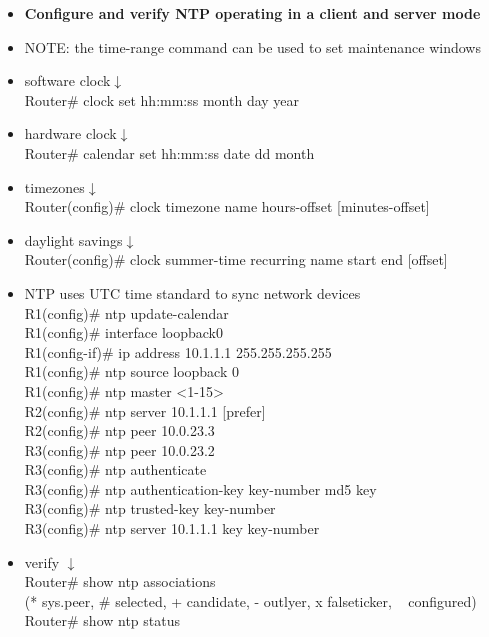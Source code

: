 \documentclass{article}
\begin{document}
\begin{itemize}
  \item \textbf{Configure and verify NTP operating in a client and server mode}
  	\item[] NOTE: the time-range command can be used to set maintenance windows\\
  	\item[] software clock$\downarrow$\\
		Router\# clock set hh:mm:ss month day year
	\item[] hardware clock$\downarrow$\\
		Router\# calendar set hh:mm:ss date dd month
	\item[] timezones$\downarrow$\\
		Router(config)\# clock timezone name hours-offset [minutes-offset]
	\item[] daylight savings$\downarrow$\\
		Router(config)\# clock summer-time recurring name start end [offset]
	\item[] NTP uses UTC time standard to sync network devices\\
		R1(config)\# ntp update-calendar\\
		R1(config)\# interface loopback0\\
		R1(config-if)\# ip address 10.1.1.1 255.255.255.255\\
		R1(config)\# ntp source loopback 0\\
		R1(config)\# ntp master \textless 1-15\textgreater\\
		R2(config)\# ntp server 10.1.1.1 [prefer]\\
		R2(config)\# ntp peer 10.0.23.3\\
		R3(config)\# ntp peer 10.0.23.2\\
		R3(config)\# ntp authenticate\\
		R3(config)\# ntp authentication-key key-number md5 key\\
		R3(config)\# ntp trusted-key key-number\\
		R3(config)\# ntp server 10.1.1.1 key key-number
	\item[] verify $\downarrow$\\
		Router\# show ntp associations\\
		(* sys.peer, \# selected, + candidate, - outlyer, x falseticker, ~ configured)\\
		Router\# show ntp status
		

\end{itemize}
\end{document}
